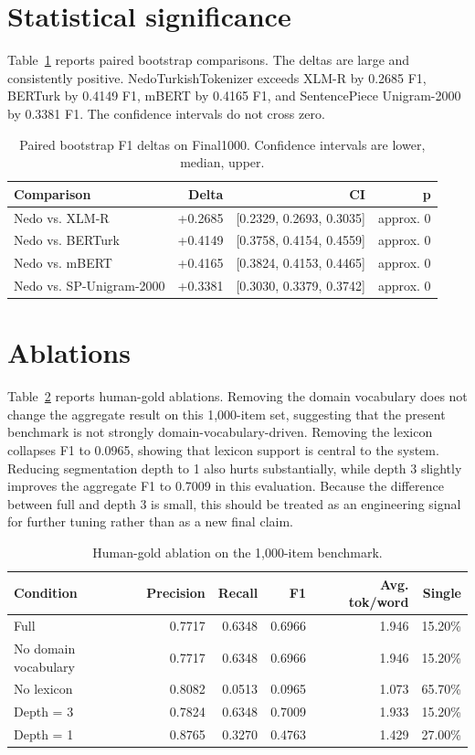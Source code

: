 \documentclass[11pt]{article}
\begin{document}
\section{Statistical significance}
Table~\ref{tab:bootstrap} reports paired bootstrap comparisons. The deltas are large and consistently positive. NedoTurkishTokenizer exceeds XLM-R by 0.2685 F1, BERTurk by 0.4149 F1, mBERT by 0.4165 F1, and SentencePiece Unigram-2000 by 0.3381 F1. The confidence intervals do not cross zero.

\begin{table}[h]
\centering
\caption{Paired bootstrap F1 deltas on Final1000. Confidence intervals are lower, median, upper.}
\label{tab:bootstrap}
\begin{tabular}{lrrr}
\toprule
Comparison & Delta & CI & p \\
\midrule
Nedo vs. XLM-R & +0.2685 & [0.2329, 0.2693, 0.3035] & approx. 0 \\
Nedo vs. BERTurk & +0.4149 & [0.3758, 0.4154, 0.4559] & approx. 0 \\
Nedo vs. mBERT & +0.4165 & [0.3824, 0.4153, 0.4465] & approx. 0 \\
Nedo vs. SP-Unigram-2000 & +0.3381 & [0.3030, 0.3379, 0.3742] & approx. 0 \\
\bottomrule
\end{tabular}
\end{table}

\section{Ablations}
Table~\ref{tab:ablation} reports human-gold ablations. Removing the domain vocabulary does not change the aggregate result on this 1,000-item set, suggesting that the present benchmark is not strongly domain-vocabulary-driven. Removing the lexicon collapses F1 to 0.0965, showing that lexicon support is central to the system. Reducing segmentation depth to 1 also hurts substantially, while depth 3 slightly improves the aggregate F1 to 0.7009 in this evaluation. Because the difference between full and depth 3 is small, this should be treated as an engineering signal for further tuning rather than as a new final claim.

\begin{table}[h]
\centering
\caption{Human-gold ablation on the 1,000-item benchmark.}
\label{tab:ablation}
\begin{tabular}{lrrrrr}
\toprule
Condition & Precision & Recall & F1 & Avg. tok/word & Single \\
\midrule
Full & 0.7717 & 0.6348 & 0.6966 & 1.946 & 15.20\% \\
No domain vocabulary & 0.7717 & 0.6348 & 0.6966 & 1.946 & 15.20\% \\
No lexicon & 0.8082 & 0.0513 & 0.0965 & 1.073 & 65.70\% \\
Depth = 3 & 0.7824 & 0.6348 & 0.7009 & 1.933 & 15.20\% \\
Depth = 1 & 0.8765 & 0.3270 & 0.4763 & 1.429 & 27.00\% \\
\bottomrule
\end{tabular}
\end{table}
\end{document}
